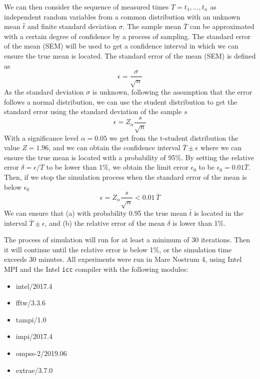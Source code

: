 We can then consider the sequence of measured times $T = t_1,\ldots,t_n$ as 
independent random variables from a common distribution with an unknown mean 
$\hat t$ and finite standard deviation $\sigma$. The sample mean $\overline T$ 
can be approximated with a certain degree of confidence by a process of 
sampling. The standard error of the mean (SEM) will be used to get a confidence 
interval in which we can ensure the true mean is located. The standard error of 
the mean (SEM) is defined as
%
\begin{equation}
\epsilon = \frac{\sigma}{\sqrt{n}}
\end{equation}
%
As the standard deviation $\sigma$ is unknown, following the assumption that the 
error follows a normal distribution, we can use the student distribution to get 
the standard error using the standard deviation of the sample $s$
%
\begin{equation}
\epsilon = Z_\alpha\frac{s}{\sqrt{n}}
\end{equation}
%
With a significance level $\alpha=0.05$ we get from the t-student distribution 
the value $Z=1.96$, and we can obtain the confidence interval $\overline T \pm 
\epsilon$ where we can ensure the true mean is located with a probability of 
95\%. By setting the relative error $\delta = \epsilon / \overline T$ to be 
lower than 1\%, we obtain the limit error $\epsilon_0$ to be $\epsilon_0 = 0.01 
\overline T$.
%
Then, if we stop the simulation process when the standard error of the mean is 
below $\epsilon_0$
%
\begin{equation}
\epsilon = Z_\alpha\frac{s}{\sqrt{n}} < 0.01 \, \overline T
\end{equation}
%
We can ensure that (a) with probability 0.95 the true mean $\hat t$ is located 
in the interval $\overline T \pm \epsilon$, and (b) the relative error of the 
mean $\delta$ is lower than 1\%.

The process of simulation will run for at least a minimum of 30 iterations. Then 
it will continue until the relative error is below 1\%, or the simulation time 
exceeds 30 minutes.
%
All experiments were run in Mare Nostrum 4, using Intel MPI and the Intel 
\texttt{icc} compiler with the following modules:
\begin{multicols}{3}
\begin{itemize}
\item intel/2017.4
\item fftw/3.3.6
\item tampi/1.0
\item impi/2017.4
\item ompss-2/2019.06
\item extrae/3.7.0
\end{itemize}
\end{multicols}

